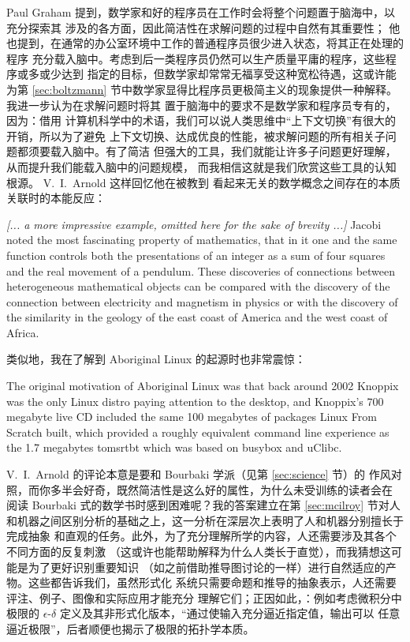 Paul Graham 提到，数学家和好的程序员在工作时会将整个问题置于脑海中，以充分探索其
涉及的各方面，因此简洁性在求解问题的过程中自然有其重要性；
他也提到，在通常的办公室环境中工作的普通程序员很少进入状态，将其正在处理的程序
充分载入脑中。考虑到后一类程序员仍然可以生产质量平庸的程序，这些程序或多或少达到
指定的目标，但数学家却常常无福享受这种宽松待遇，这或许能为第 \ref{sec:boltzmann}
节中数学家显得比程序员更极简主义的现象提供一种解释。我进一步认为在求解问题时将其
置于脑海中的要求不是数学家和程序员专有的，因为：借用
计算机科学中的术语，我们可以说人类思维中“上下文切换”有很大的开销，所以为了避免
上下文切换、达成优良的性能，被求解问题的所有相关子问题都须要载入脑中。有了简洁
但强大的工具，我们就能让许多子问题更好理解，从而提升我们能载入脑中的问题规模，
而我相信这就是我们欣赏这些工具的认知根源。 V.~I.\ Arnold 这样回忆他在被教到
看起来无关的数学概念之间存在的本质关联时的本能反应：
\begin{quoting}
	\emph{[... a more impressive example, omitted here for the sake of
	brevity ...]} Jacobi noted the most fascinating property of mathematics,
	that in it one and the same function controls both the presentations of
	an integer as a sum of four squares and the real movement of a pendulum.
	These discoveries of connections between heterogeneous mathematical objects
	can be compared with the discovery of the connection between electricity
	and magnetism in physics or with the discovery of the similarity in
	the geology of the east coast of America and the west coast of Africa.
\end{quoting}
类似地，我在了解到 Aboriginal Linux 的起源时也非常震惊：
\begin{quoting}
	The original motivation of Aboriginal Linux was that back around
	2002 Knoppix was the only Linux distro paying attention to the
	desktop, and Knoppix's 700 megabyte live CD included the same
	100 megabytes of packages Linux From Scratch built, which
	provided a roughly equivalent command line experience as the
	1.7 megabytes tomsrtbt which was based on busybox and uClibc.
\end{quoting}

V.~I.\ Arnold 的评论本意是要和 Bourbaki 学派（见第 \ref{sec:science} 节）的
作风对照，而你多半会好奇，既然简洁性是这么好的属性，为什么未受训练的读者会在
阅读 Bourbaki 式的数学书时感到困难呢？我的答案建立在第 \ref{sec:mcilroy} 节对人
和机器之间区别分析的基础之上，这一分析在深层次上表明了人和机器分别擅长于完成抽象
和直观的任务。此外，为了充分理解所学的内容，人还需要涉及其各个不同方面的反复刺激
（这或许也能帮助解释为什么人类长于直觉），而我猜想这可能是为了更好识别重要知识
（如之前借助推导图讨论的一样）进行自然适应的产物。这些都告诉我们，虽然形式化
系统只需要命题和推导的抽象表示，人还需要评注、例子、图像和实际应用才能充分
理解它们；正因如此，：例如考虑微积分中极限的 $\epsilon$-$\delta$
定义及其非形式化版本，“通过使输入充分逼近指定值，输出可以
任意逼近极限”，后者顺便也揭示了极限的拓扑学本质。

